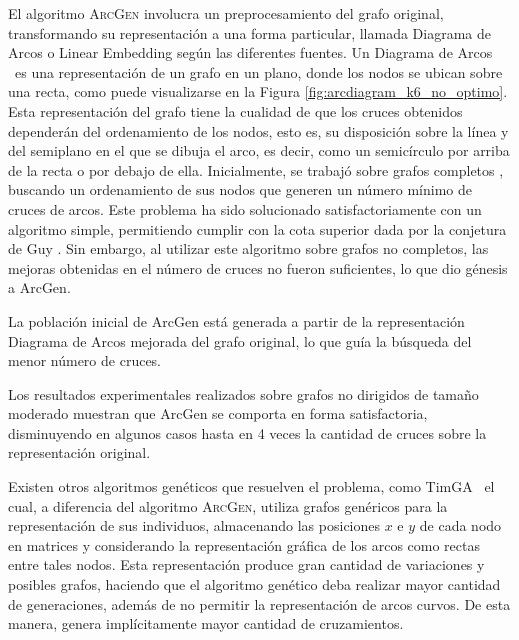 	El algoritmo \textsc{ArcGen} involucra un preprocesamiento del grafo original, transformando su representación a una forma particular, llamada Diagrama de Arcos \cite{saaty1964minimum} o Linear Embedding \cite{masuda1990crossing} según las diferentes fuentes. Un Diagrama de Arcos \cite{Wat02,Nich68,saaty1964minimum}\ es una representación de un grafo en un plano, donde los nodos se ubican sobre una recta, como puede visualizarse en la Figura \ref{fig:arcdiagram_k6_no_optimo}. Esta representación del grafo tiene la cualidad de %
	que los cruces obtenidos dependerán del ordenamiento de los nodos, esto es, su disposición sobre la línea y del  semiplano en el que se  dibuja el arco, es decir, como un semicírculo por arriba de la recta o por debajo de ella. %
	Inicialmente, se trabajó sobre grafos completos \cite{Aich02}, buscando un ordenamiento de sus nodos que generen un número mínimo de cruces de arcos.
	Este problema ha sido solucionado satisfactoriamente con un algoritmo simple, permitiendo cumplir con la cota superior dada por la conjetura de Guy \cite{guy1960combinatorial}. %
	Sin embargo,  al utilizar este algoritmo sobre grafos no completos, las  mejoras obtenidas en el número de cruces no fueron suficientes, lo que dio génesis a {\sc ArcGen}.
	
	La  población inicial de {\sc ArcGen}  está generada a partir de la representación Diagrama de Arcos mejorada del  grafo original, lo que guía la búsqueda del menor número de cruces.%
	
	Los resultados experimentales realizados sobre grafos no dirigidos de tamaño moderado muestran que  {\sc ArcGen} se comporta en forma satisfactoria, disminuyendo en algunos casos hasta en 4 veces la cantidad de cruces sobre la representación original. 
	
	Existen otros  algoritmos genéticos que resuelven el problema, como  TimGA \cite{eloranta2001timga}\ el cual, a diferencia del algoritmo \textsc{ArcGen}, utiliza grafos genéricos para la representación de sus individuos, almacenando las posiciones $x$ e $y$ de cada nodo en matrices y considerando la representación gráfica de los arcos como rectas entre tales nodos. Esta representación produce gran cantidad de variaciones y posibles grafos, haciendo que el algoritmo genético deba realizar mayor cantidad de generaciones, además de no permitir la representación de arcos curvos. De esta manera, genera implícitamente mayor cantidad de cruzamientos. 
	
